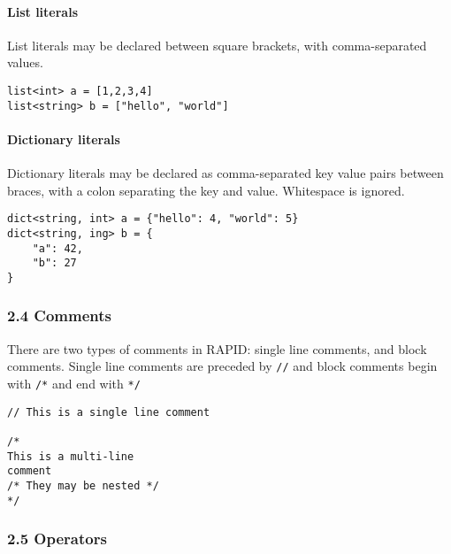 \paragraph{List literals}\label{list-literals}

List literals may be declared between square brackets, with
comma-separated values.

\begin{verbatim}
list<int> a = [1,2,3,4]
list<string> b = ["hello", "world"]
\end{verbatim}

\paragraph{Dictionary literals}\label{dictionary-literals}

Dictionary literals may be declared as comma-separated key value pairs
between braces, with a colon separating the key and value. Whitespace is
ignored.

\begin{verbatim}
dict<string, int> a = {"hello": 4, "world": 5}
dict<string, ing> b = {
    "a": 42,
    "b": 27
}
\end{verbatim}

\subsubsection{2.4 Comments}\label{comments}

There are two types of comments in RAPID: single line comments, and
block comments. Single line comments are preceded by \texttt{//} and
block comments begin with \texttt{/*} and end with \texttt{*/}

\begin{verbatim}
// This is a single line comment

/*
This is a multi-line
comment
/* They may be nested */
*/
\end{verbatim}

\subsubsection{2.5 Operators}\label{operators}

